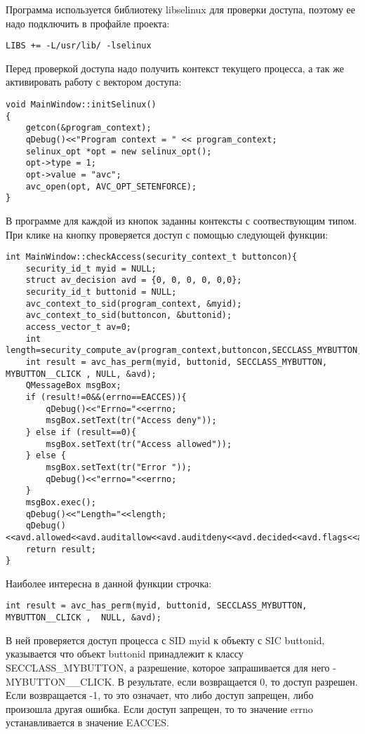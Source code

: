 \documentclass{./../class/UIR}
\begin{document}
     Программа используется библиотеку libselinux для проверки доступа, поэтому
     ее надо подключить в профайле проекта:
     
     \begin{verbatim}
LIBS += -L/usr/lib/ -lselinux
     \end{verbatim}
     
     Перед проверкой доступа надо получить контекст текущего процесса, а так же
     активировать работу с вектором доступа:
     \begin{verbatim}
void MainWindow::initSelinux()
{
    getcon(&program_context);
    qDebug()<<"Program context = " << program_context;
    selinux_opt *opt = new selinux_opt();
    opt->type = 1;
    opt->value = "avc";
    avc_open(opt, AVC_OPT_SETENFORCE);
}
     \end{verbatim}
    В программе для каждой из кнопок заданны контексты с соотвествующим типом.
    При клике на кнопку проверяется доступ с помощью следующей функции:
    \begin{verbatim}
int MainWindow::checkAccess(security_context_t buttoncon){
    security_id_t myid = NULL;
    struct av_decision avd = {0, 0, 0, 0, 0,0};
    security_id_t buttonid = NULL;
    avc_context_to_sid(program_context, &myid);
    avc_context_to_sid(buttoncon, &buttonid);
    access_vector_t av=0;
    int length=security_compute_av(program_context,buttoncon,SECCLASS_MYBUTTON,av,&avd);
    int result = avc_has_perm(myid, buttonid, SECCLASS_MYBUTTON, MYBUTTON__CLICK , NULL, &avd);
    QMessageBox msgBox;
    if (result!=0&&(errno==EACCES)){
        qDebug()<<"Errno="<<errno;
        msgBox.setText(tr("Access deny"));
    } else if (result==0){
        msgBox.setText(tr("Access allowed"));
    } else {
        msgBox.setText(tr("Error "));
        qDebug()<<"errno="<<errno;
    }
    msgBox.exec();
    qDebug()<<"Length="<<length;
    qDebug()<<avd.allowed<<avd.auditallow<<avd.auditdeny<<avd.decided<<avd.flags<<avd.seqno;
    return result;
}
    \end{verbatim}
	Наиболее интересна в данной функции строчка:
	\begin{verbatim}
int result = avc_has_perm(myid, buttonid, SECCLASS_MYBUTTON, MYBUTTON__CLICK ,	NULL, &avd);
	\end{verbatim}
	В ней проверяется доступ процесса с SID myid к объекту с SIC buttonid,
	указывается что объект buttonid принадлежит к классу SECCLASS\_MYBUTTON, а
	разрешение, которое запрашивается для него - MYBUTTON\_\_CLICK.
	В результате, если возвращается 0, то доступ разрешен. Если возвращается -1, то
	это означает, что либо доступ запрещен, либо произошла другая ошибка. Если
	доступ запрещен, то то значение errno устанавливается в значение EACCES.
	
\end{document}
